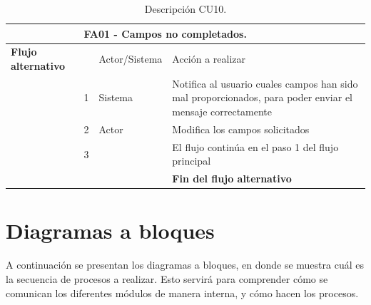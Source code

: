 \begin{table}[H]
{\begin{tabular}{| p{} | p{} |p{4cm}|p{5cm}|}
     \hline
     & \multicolumn{3}{|l|}{\textbf{FA01 - Campos no completados}.}\\
     \hline
     \textbf{Flujo alternativo} & & Actor/Sistema & Acción a realizar\\
     \hline
     & 1 & Sistema & Notifica al usuario cuales campos han sido mal proporcionados, para poder enviar el mensaje correctamente\\
     \hline
     & 2 & Actor & Modifica los campos solicitados\\
     \hline
     & 3 &  & El flujo continúa en el paso 1 del flujo principal\\
     \hline
     &  & & \textbf{Fin del flujo alternativo}\\
     
     \end{tabular}
    }
    \caption{Descripción CU10.}
    \label{tabla:CU10}
\end{table}



\pagebreak
\section{Diagramas a bloques}
A continuación se presentan los diagramas a bloques, en donde se muestra cuál es la secuencia de procesos a realizar. Esto servirá para comprender cómo se comunican los diferentes módulos de manera interna, y cómo hacen los procesos.


